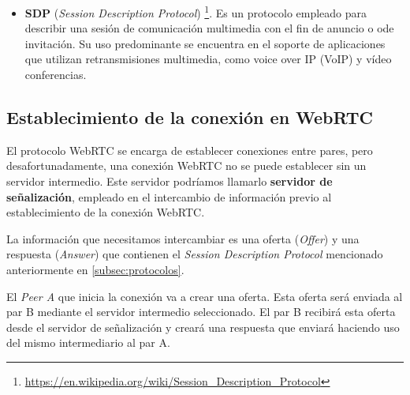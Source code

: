 \documentclass[a4paper, 12pt]{book}
\begin{document}
\begin{itemize}
\item \textbf{SDP} (\textit{Session Description Protocol}) \footnote{\url{https://en.wikipedia.org/wiki/Session_Description_Protocol}}. Es un protocolo empleado para describir una sesión de comunicación multimedia con el fin de anuncio o ode invitación. Su uso predominante se encuentra en el soporte de aplicaciones que utilizan retransmisiones multimedia, como voice over IP (VoIP) y vídeo conferencias.

\end{itemize}

\subsection{Establecimiento de la conexión en WebRTC}
\label{subsec:establecimiento_conexion}

El protocolo WebRTC se encarga de establecer conexiones entre pares, pero desafortunadamente, una conexión WebRTC no se puede establecer sin un servidor intermedio. Este servidor podríamos llamarlo \textbf{servidor de señalización}, empleado en el intercambio de información previo al establecimiento de la conexión WebRTC.

La información que necesitamos intercambiar es una oferta (\textit{Offer}) y una respuesta (\textit{Answer}) que contienen el \textit{Session Description Protocol} mencionado anteriormente en \ref{subsec:protocolos}.

El \textit{Peer A} que inicia la conexión va a crear una oferta. Esta oferta será enviada al par B mediante el servidor intermedio seleccionado. El par B recibirá esta oferta desde el servidor de señalización y creará una respuesta que enviará haciendo uso del mismo intermediario al par A.
\end{document}
